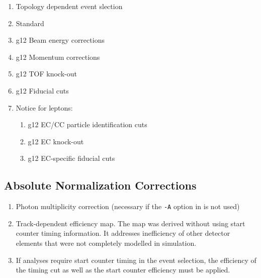 \documentclass[10pt,twocolumn,oneside,letterpaper]{article}
\begin{document}
\begin{enumerate}
    \item Topology dependent event slection
    \item Standard 
    \item g12 Beam energy corrections
    \item g12 Momentum corrections
    \item g12 TOF knock-out
    \item g12 Fiducial cuts
    \item Notice for leptons:
    \begin{enumerate}
        \item g12 EC/CC particle identification cuts
        \item g12 EC knock-out
        \item g12 EC-specific fiducial cuts
    \end{enumerate}
\end{enumerate}

\subsection{Absolute Normalization Corrections}

\begin{enumerate}
    \item Photon multiplicity correction (necessary if the \verb|-A| option in  is not used)
    \item Track-dependent efficiency map. The map was derived without using start counter timing information. It addresses inefficiency of other detector elements that were not completely modelled in simulation.
    \item If analyses require start counter timing in the event selection, the efficiency of the timing cut as well as the start counter efficiency must be applied.
\end{enumerate}
\end{document}
